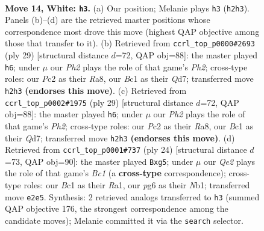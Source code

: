 \documentclass[11pt]{article}
\begin{document}
\begin{figure}[p]
\label{fig:thought-m24}
\end{figure}

\clearpage

\begin{figure}[p]\centering
\begin{subfigure}{0.46\textwidth}\centering
\resizebox{\linewidth}{!}{%
\newchessgame
\chessboard[
  setfen={r1b2rk1/2p2p2/2p2np1/p2qp1Np/8/2PP2P1/P1P1QP1P/R1B2RK1 w - - 0 14},
  showmover=false,
  pgfstyle=straightmove, color=movearrow, markmove={h2-h3}
]}
\caption{}
\end{subfigure}\hfill
\begin{subfigure}{0.46\textwidth}\centering
\resizebox{\linewidth}{!}{%
\newchessgame
\chessboard[
  setfen={r4rk1/pp1qppbp/2n3p1/3pP3/3P3P/1QP2N2/P4PP1/R1B1R1K1 b - - 0 15},
  showmover=false,
  pgfstyle=straightmove, color=movearrow, markmove={h7-h6}
]}
\caption{}
\end{subfigure}
\\[4pt]
\begin{subfigure}{0.46\textwidth}\centering
\resizebox{\linewidth}{!}{%
\newchessgame
\chessboard[
  setfen={r4rk1/pp1qppbp/2n3p1/3pP3/3P3P/1QP2N2/P4PP1/R1B1R1K1 b - - 0 15},
  showmover=false,
  pgfstyle=straightmove, color=movearrow, markmove={h7-h6}
]}
\caption{}
\end{subfigure}\hfill
\begin{subfigure}{0.46\textwidth}\centering
\resizebox{\linewidth}{!}{%
\newchessgame
\chessboard[
  setfen={r3kb1r/1ppq1p1p/p4n2/4p1p1/2Q1P3/2P4P/PP3PP1/RNB2RK1 w kq - 0 13},
  showmover=false,
  pgfstyle=straightmove, color=movearrow, markmove={c1-g5}
]}
\caption{}
\end{subfigure}
\caption{\textbf{Move 14, White: \texttt{h3}.} (a) Our position; Melanie plays \texttt{h3} (\texttt{h2h3}). Panels (b)--(d) are the retrieved master positions whose correspondence most drove this move (highest QAP objective among those that transfer to it). (b) Retrieved from \texttt{ccrl\_top\_p0000\#2693} (ply 29) [structural distance $d$=72, QAP obj=88]: the master played \texttt{h6}; under $\mu$ our \emph{Ph2} plays the role of that game's \emph{Ph2}; cross-type roles: our \emph{P}c2 as their \emph{R}a8, our \emph{B}c1 as their \emph{Q}d7; transferred move \texttt{h2h3} \textbf{(endorses this move)}. (c) Retrieved from \texttt{ccrl\_top\_p0002\#1975} (ply 29) [structural distance $d$=72, QAP obj=88]: the master played \texttt{h6}; under $\mu$ our \emph{Ph2} plays the role of that game's \emph{Ph2}; cross-type roles: our \emph{P}c2 as their \emph{R}a8, our \emph{B}c1 as their \emph{Q}d7; transferred move \texttt{h2h3} \textbf{(endorses this move)}. (d) Retrieved from \texttt{ccrl\_top\_p0001\#737} (ply 24) [structural distance $d$=73, QAP obj=90]: the master played \texttt{Bxg5}; under $\mu$ our \emph{Qe2} plays the role of that game's \emph{Bc1} (a \textbf{cross-type} correspondence); cross-type roles: our \emph{B}c1 as their \emph{R}a1, our \emph{p}g6 as their \emph{N}b1; transferred move \texttt{e2e5}. Synthesis: 2 retrieved analogs transferred to \texttt{h3} (summed QAP objective 176, the strongest correspondence among the candidate moves); Melanie committed it via the \texttt{search} selector.}

\end{figure}
\end{document}
